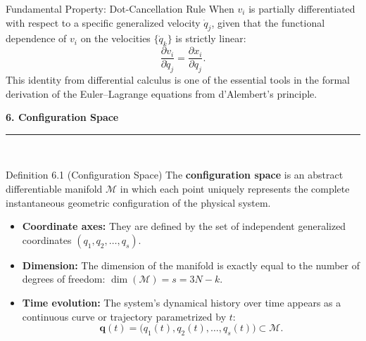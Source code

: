\documentclass[11pt,letterpaper]{article}
\newcommand{\manualsection}[1]{%
  \vspace{0.35cm}
  {\Large\bfseries\color{darkslate} #1}\\[2pt]
  {\color{tealmain!70}\rule{\linewidth}{1.2pt}}\\[0.25cm]
}
\newcommand{\termb}[1]{\textbf{\color{darkforest}#1}}
\begin{document}
\begin{ejerciciobox}{Fundamental Property: Dot-Cancellation Rule}
When $v_i$ is partially differentiated with respect to a specific generalized velocity $\dot{q}_j$, given that the functional dependence of $v_i$ on the velocities $\{\dot{q}_k\}$ is strictly linear:
\begin{equation}
    \frac{\partial v_i}{\partial \dot{q}_j} = \frac{\partial x_i}{\partial q_j}.
\end{equation}
This identity from differential calculus is one of the essential tools in the formal derivation of the Euler--Lagrange equations from d'Alembert's principle.
\end{ejerciciobox}

\manualsection{6. Configuration Space}

\begin{infobox}[purplesec]{Definition 6.1 (Configuration Space)}
The \termb{configuration space} is an abstract differentiable manifold $\mathcal{M}$ in which each point uniquely represents the complete instantaneous geometric configuration of the physical system.
\begin{itemize}
    \item \textbf{Coordinate axes:} They are defined by the set of independent generalized coordinates $(q_1, q_2, \dots, q_s)$.
    \item \textbf{Dimension:} The dimension of the manifold is exactly equal to the number of degrees of freedom: $\dim(\mathcal{M}) = s = 3N - k$.
    \item \textbf{Time evolution:} The system's dynamical history over time appears as a continuous curve or trajectory parametrized by $t$:
    \begin{equation}
        \mathbf{q}(t) = \big(q_1(t), q_2(t), \dots, q_s(t)\big) \subset \mathcal{M}.
    \end{equation}
\end{itemize}
\end{infobox}
\end{document}
